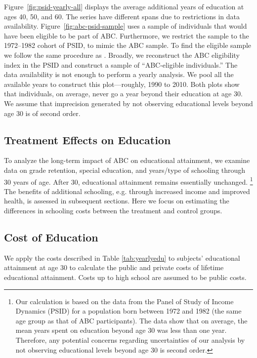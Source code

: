 \noindent Figure~\ref{fig:psid-yearly-all} displays the average additional years of education at ages 40, 50, and 60. The series have different spans due to restrictions in data availability. Figure~\ref{fig:abc-psid-sample} uses a sample of individuals that would have been eligible to be part of ABC. Furthermore, we restrict the sample to the 1972--1982 cohort of PSID, to mimic the ABC sample. To find the eligible sample we follow the same procedure as \citet{Garcia_Heckman_2014_AbilityCharacter}. Broadly, we reconstruct the ABC eligibility index in the PSID and construct a sample of ``ABC-eligible individuals.'' The data availability is not enough to perform a yearly analysis. We pool all the available years to construct this plot---roughly, 1990 to 2010. Both plots show that individuals, on average, never go a year beyond their education at age 30. We assume that imprecision generated by not observing educational levels beyond age 30 is of second order. \\


\subsection{Treatment Effects on Education}
\noindent To analyze the long-term impact of ABC on educational attainment,
we examine data on grade retention, special education, and
years/type of schooling through 30 years of age. After 30,
educational attainment remains essentially
unchanged.%
	\footnote{Our calculation is based on
	the data from the Panel of Study of Income Dynamics (PSID) for a
	population born between 1972 and 1982 (the same age group as that of
	ABC participants). The data show that on average, the mean years spent
	on  education beyond age 30 was less than one year.
	Therefore, any potential concerns regarding uncertainties of our analysis
	by not observing educational levels beyond age 30 is second
	order.}
The benefits of additional schooling, e.g. through
increased income and improved health, is assessed in
subsequent sections. Here we focus on estimating the
differences in schooling costs between the treatment and
control groups. \\

\subsection{Cost of Education}
\noindent We apply the costs described in Table \ref{tab:yearlyedu} to subjects' educational attainment at age 30 to calculate the public and private costs of lifetime educational attainment. Costs up to high school are assumed to be public costs. \\

